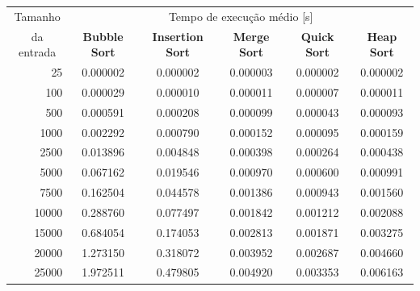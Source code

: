 \documentclass[fontsize=10pt]{article}
\begin{document}
\begin{table}[!htbp]
\centering
\begin{tabular}{@{}r|ccccc@{}}
\multicolumn{1}{c|}{Tamanho}    & \multicolumn{5}{c}{Tempo de execução médio {[}s{]}}                                                             \\
\multicolumn{1}{c|}{da entrada} & \textbf{Bubble Sort} & \textbf{Insertion Sort} & \textbf{Merge Sort} & \textbf{Quick Sort} & \textbf{Heap Sort} \\ \midrule
25                              & 0.000002             & 0.000002                & 0.000003            & 0.000002            & 0.000002           \\
100                             & 0.000029             & 0.000010                & 0.000011            & 0.000007            & 0.000011           \\
500                             & 0.000591             & 0.000208                & 0.000099            & 0.000043            & 0.000093           \\
1000                            & 0.002292             & 0.000790                & 0.000152            & 0.000095            & 0.000159           \\
2500                            & 0.013896             & 0.004848                & 0.000398            & 0.000264            & 0.000438           \\
5000                            & 0.067162             & 0.019546                & 0.000970            & 0.000600            & 0.000991           \\
7500                            & 0.162504             & 0.044578                & 0.001386            & 0.000943            & 0.001560           \\
10000                           & 0.288760             & 0.077497                & 0.001842            & 0.001212            & 0.002088           \\
15000                           & 0.684054             & 0.174053                & 0.002813            & 0.001871            & 0.003275           \\
20000                           & 1.273150             & 0.318072                & 0.003952            & 0.002687            & 0.004660           \\
25000                           & 1.972511             & 0.479805                & 0.004920            & 0.003353            & 0.006163           \\

\end{tabular}
\end{table}
\end{document}

